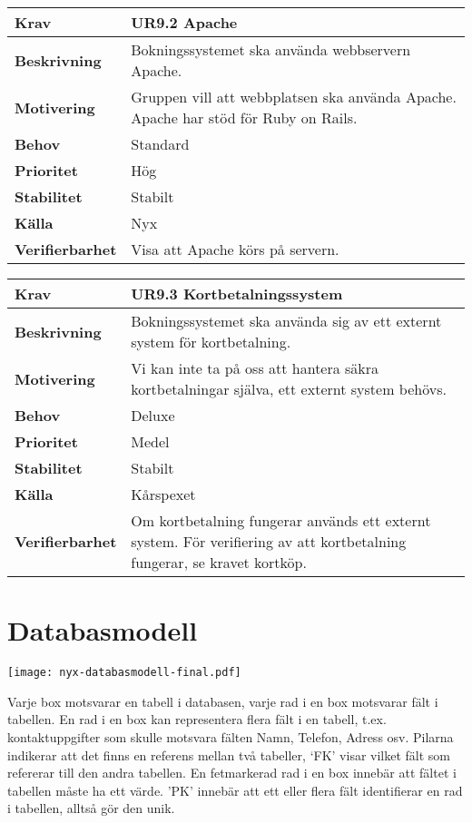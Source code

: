 \documentclass[a4paper, twoside, 11pt, titlepage]{article}
\begin{document}
		\begin{tabular} { p{2.6cm} p{12.5cm} }
			\hline
			\sffamily\textbf{Krav} & \sffamily\textbf{UR9.2 Apache } \\
			\hline
			\sffamily\textbf{Beskrivning} & Bokningssystemet ska använda webbservern Apache.  \\
			\hline
			\sffamily\textbf{Motivering} & Gruppen vill att webbplatsen ska använda Apache. Apache har stöd för Ruby on Rails.  \\
			\hline
			\sffamily\textbf{Behov} & Standard  \\
			\hline
			\sffamily\textbf{Prioritet} & Hög  \\
			\hline
			\sffamily\textbf{Stabilitet} & Stabilt  \\
			\hline
			\sffamily\textbf{Källa} & Nyx  \\
			\hline
			\sffamily\textbf{Verifierbarhet} & Visa att Apache körs på servern.  \\
			\hline
		\end{tabular}
		\vspace{6mm}

		\begin{tabular} { p{2.6cm} p{12.5cm} }
			\hline
			\sffamily\textbf{Krav} & \sffamily\textbf{UR9.3 Kortbetalningssystem } \\
			\hline
			\sffamily\textbf{Beskrivning} & Bokningssystemet ska använda sig av ett externt system för kortbetalning.  \\
			\hline
			\sffamily\textbf{Motivering} & Vi kan inte ta på oss att hantera säkra kortbetalningar själva, ett externt system behövs.  \\
			\hline
			\sffamily\textbf{Behov} & Deluxe  \\
			\hline
			\sffamily\textbf{Prioritet} & Medel  \\
			\hline
			\sffamily\textbf{Stabilitet} & Stabilt  \\
			\hline
			\sffamily\textbf{Källa} & Kårspexet  \\
			\hline
			\sffamily\textbf{Verifierbarhet} & Om kortbetalning fungerar används ett externt system. För verifiering av att kortbetalning fungerar, se kravet kortköp.  \\
			\hline
		\end{tabular}


\clearpage
	\appendix

\clearpage
\section{Databasmodell}


\texttt{[image: nyx-databasmodell-final.pdf]}

Varje box motsvarar en tabell i databasen, varje rad i en box motsvarar fält i tabellen. En rad i en box kan representera flera fält i en tabell, t.ex. kontaktuppgifter som skulle motsvara fälten Namn, Telefon, Adress osv. Pilarna indikerar att det finns en referens mellan två tabeller, ‘FK’ visar vilket fält som refererar till den andra tabellen. En fetmarkerad rad i en box innebär att fältet i tabellen måste ha ett värde. 'PK' innebär att ett eller flera fält identifierar en rad i tabellen, alltså gör den unik.
\end{document}
